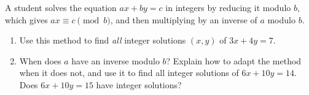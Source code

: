 A student solves the equation $ax+by=c$ in integers by reducing it modulo $b$, which gives $ax\equiv c\pmod b$, and then multiplying by an inverse of $a$ modulo $b$.
\begin{enumerate}
\item[(a)] Use this method to find \emph{all} integer solutions $(x,y)$ of $3x+4y=7$.
\item[(b)] When does $a$ have an inverse modulo $b$? Explain how to adapt the method when it does not, and use it to find all integer solutions of $6x+10y=14$. Does $6x+10y=15$ have integer solutions?
\end{enumerate}
